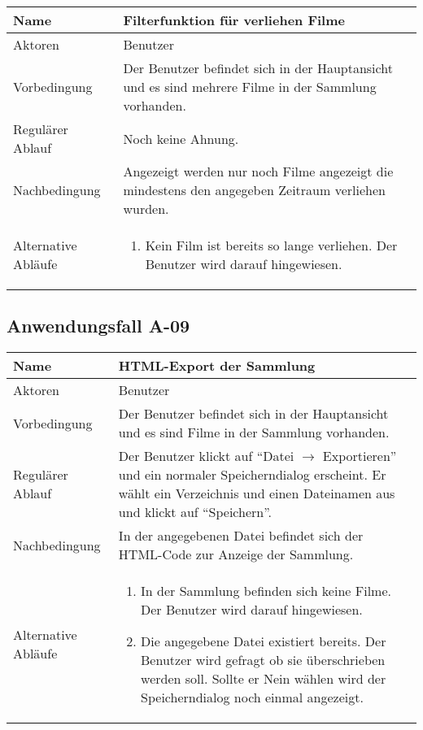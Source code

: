 \documentclass[oneside,german,oneside]{scrbook}
\begin{document}
      \begin{tabular}{|b|p{10cm}|}
        \hline
        Name & Filterfunktion f\"ur verliehen Filme \\
        \hline
        Aktoren & Benutzer \\
        \hline
        \hline
        Vorbedingung & Der Benutzer befindet sich in der Hauptansicht und es
        sind mehrere Filme in der Sammlung vorhanden.\\
        \hline
        Regul\"arer Ablauf & Noch keine Ahnung.\\
        \hline
        Nachbedingung & Angezeigt werden nur noch Filme angezeigt die mindestens
        den angegeben Zeitraum verliehen wurden.\\
        \hline
        Alternative Abl\"aufe &
        \begin{enumerate}
          \item Kein Film ist bereits so lange verliehen. Der Benutzer wird
          darauf hingewiesen.
        \end{enumerate}\\
        \hline
      \end{tabular}

    \subsection{Anwendungsfall A-09}\label{uc:09}

      \begin{tabular}{|b|p{10cm}|}
        \hline
        Name & HTML-Export der Sammlung \\
        \hline
        Aktoren & Benutzer \\
        \hline
        \hline
        Vorbedingung & Der Benutzer befindet sich in der Hauptansicht und es
        sind Filme in der Sammlung vorhanden.\\
        \hline
        Regul\"arer Ablauf & Der Benutzer klickt auf ``Datei $\rightarrow$ Exportieren''
        und ein normaler Speicherndialog erscheint. Er w\"ahlt ein Verzeichnis
        und einen Dateinamen aus und klickt auf ``Speichern''.\\
        \hline
        Nachbedingung & In der angegebenen Datei befindet sich der HTML-Code
        zur Anzeige der Sammlung.\\
        \hline
        Alternative Abl\"aufe &
        \begin{enumerate}
          \item In der Sammlung befinden sich keine Filme. Der Benutzer wird
          darauf hingewiesen.
          \item Die angegebene Datei existiert bereits. Der Benutzer wird
          gefragt ob sie \"uberschrieben werden soll. Sollte er Nein w\"ahlen wird
          der Speicherndialog noch einmal angezeigt.
        \end{enumerate}\\
        \hline
      \end{tabular}
\end{document}
